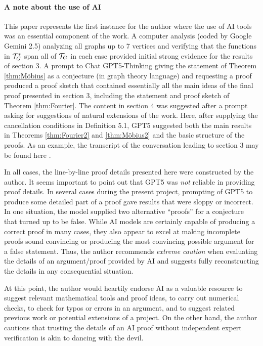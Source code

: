 \documentclass[12pt]{article}
\theoremstyle{definition}
\begin{document}
\paragraph{A note about the use of AI} This paper represents the first instance for the author where the use of AI tools was an essential component of the work. A computer analysis (coded by Google Gemini 2.5) analyzing all graphs up to 7 vertices and verifying that the functions in ${\cal T}_G^*$ span all of ${\cal T}_G$ in each case provided initial strong evidence for the results of section 3. A prompt to Chat GPT5-Thinking giving the statement of Theorem \ref{thm:Möbius} as a conjecture (in graph theory language) and requesting a proof produced a proof sketch that contained essentially all the main ideas of the final proof presented in section 3, including the statement and proof sketch of Theorem \ref{thm:Fourier}. The content in section 4 was suggested after a prompt asking for suggestions of natural extensions of the work. Here, after supplying the cancellation conditions in Definition 5.1, GPT5 suggested both the main results in Theorems \ref{thm:Fourier2} and \ref{thm:Möbius2} and the basic structure of the proofs. As an example, the transcript of the conversation leading to section 3 may be found here \cite{GPT5}.

In all cases, the line-by-line proof details presented here were constructed by the author. It seems important to point out that GPT5 was {\it not} reliable in providing proof details. In several cases during the present project, prompting of GPT5 to produce some detailed part of a proof gave results that were sloppy or incorrect. In one situation, the model supplied two alternative ``proofs'' for a conjecture that turned up to be false.
While AI models are certainly capable of producing a correct proof in many cases, they also appear to excel at making incomplete proofs sound convincing or producing the most convincing possible argument for a false statement. Thus, the author recommends {\it extreme caution} when evaluating the details of an argument/proof provided by AI and suggests fully reconstructing the details in any consequential situation.

At this point, the author would heartily endorse AI as a valuable resource to suggest relevant mathematical tools and proof ideas, to carry out numerical checks, to check for typos or errors in an argument, and to suggest related previous work or potential extensions of a project. On the other hand, the author cautions that trusting the details of an AI proof without independent expert verification is akin to dancing with the devil.
\end{document}
